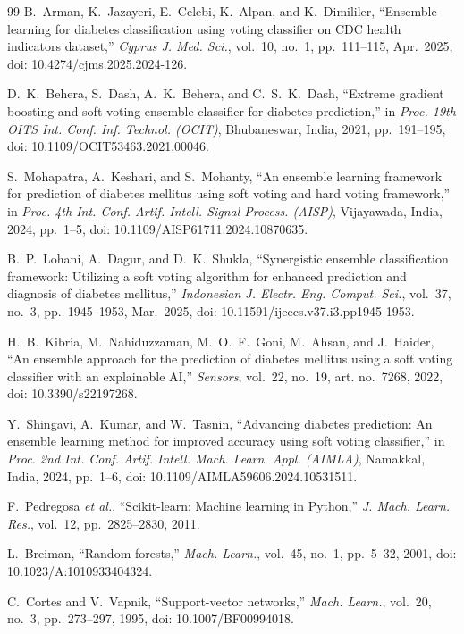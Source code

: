 \documentclass[conference]{IEEEtran}
\begin{document}
\begin{thebibliography}{99}
B.~Arman, K.~Jazayeri, E.~Celebi, K.~Alpan, and K.~Dimililer, ``Ensemble learning for diabetes classification using voting classifier on CDC health indicators dataset,'' \textit{Cyprus J. Med. Sci.}, vol.~10, no.~1, pp.~111--115, Apr.~2025, doi: 10.4274/cjms.2025.2024-126.

D.~K.~Behera, S.~Dash, A.~K.~Behera, and C.~S.~K.~Dash, ``Extreme gradient boosting and soft voting ensemble classifier for diabetes prediction,'' in \textit{Proc. 19th OITS Int. Conf. Inf. Technol. (OCIT)}, Bhubaneswar, India, 2021, pp.~191--195, doi: 10.1109/OCIT53463.2021.00046.

S.~Mohapatra, A.~Keshari, and S.~Mohanty, ``An ensemble learning framework for prediction of diabetes mellitus using soft voting and hard voting framework,'' in \textit{Proc. 4th Int. Conf. Artif. Intell. Signal Process. (AISP)}, Vijayawada, India, 2024, pp.~1--5, doi: 10.1109/AISP61711.2024.10870635.

B.~P.~Lohani, A.~Dagur, and D.~K.~Shukla, ``Synergistic ensemble classification framework: Utilizing a soft voting algorithm for enhanced prediction and diagnosis of diabetes mellitus,'' \textit{Indonesian J. Electr. Eng. Comput. Sci.}, vol.~37, no.~3, pp.~1945--1953, Mar.~2025, doi: 10.11591/ijeecs.v37.i3.pp1945-1953.

H.~B.~Kibria, M.~Nahiduzzaman, M.~O.~F.~Goni, M.~Ahsan, and J.~Haider, ``An ensemble approach for the prediction of diabetes mellitus using a soft voting classifier with an explainable AI,'' \textit{Sensors}, vol.~22, no.~19, art. no.~7268, 2022, doi: 10.3390/s22197268.

Y.~Shingavi, A.~Kumar, and W.~Tasnin, ``Advancing diabetes prediction: An ensemble learning method for improved accuracy using soft voting classifier,'' in \textit{Proc. 2nd Int. Conf. Artif. Intell. Mach. Learn. Appl. (AIMLA)}, Namakkal, India, 2024, pp.~1--6, doi: 10.1109/AIMLA59606.2024.10531511.

F.~Pedregosa \textit{et al.}, ``Scikit-learn: Machine learning in Python,'' \textit{J. Mach. Learn. Res.}, vol.~12, pp.~2825--2830, 2011.

L.~Breiman, ``Random forests,'' \textit{Mach. Learn.}, vol.~45, no.~1, pp.~5--32, 2001, doi: 10.1023/A:1010933404324.

C.~Cortes and V.~Vapnik, ``Support-vector networks,'' \textit{Mach. Learn.}, vol.~20, no.~3, pp.~273--297, 1995, doi: 10.1007/BF00994018.


\end{thebibliography}
\end{document}

